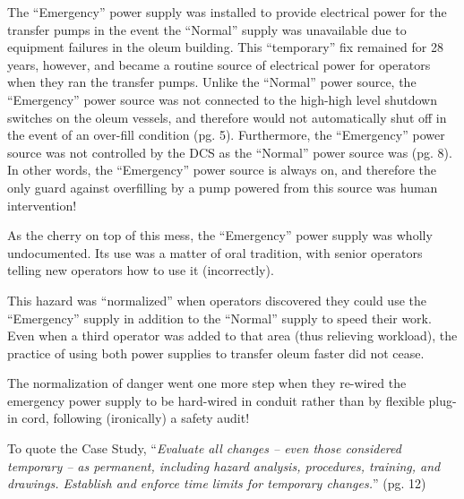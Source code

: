 \vskip 10pt

The ``Emergency'' power supply was installed to provide electrical power for the transfer pumps in the event the ``Normal'' supply was unavailable due to equipment failures in the oleum building.  This ``temporary'' fix remained for 28 years, however, and became a routine source of electrical power for operators when they ran the transfer pumps.  Unlike the ``Normal'' power source, the ``Emergency'' power source was not connected to the high-high level shutdown switches on the oleum vessels, and therefore would not automatically shut off in the event of an over-fill condition (pg. 5).  Furthermore, the ``Emergency'' power source was not controlled by the DCS as the ``Normal'' power source was (pg. 8).  In other words, the ``Emergency'' power source is always on, and therefore the only guard against overfilling by a pump powered from this source was human intervention!

As the cherry on top of this mess, the ``Emergency'' power supply was wholly undocumented.  Its use was a matter of oral tradition, with senior operators telling new operators how to use it (incorrectly).

\vskip 10pt

This hazard was ``normalized'' when operators discovered they could use the ``Emergency'' supply in addition to the ``Normal'' supply to speed their work.  Even when a third operator was added to that area (thus relieving workload), the practice of using both power supplies to transfer oleum faster did not cease.

The normalization of danger went one more step when they re-wired the emergency power supply to be hard-wired in conduit rather than by flexible plug-in cord, following (ironically) a safety audit!

\vskip 10pt

To quote the Case Study, ``{\it Evaluate all changes -- even those considered temporary -- as permanent, including hazard analysis, procedures, training, and drawings.  Establish and enforce time limits for temporary changes.}'' (pg. 12)





